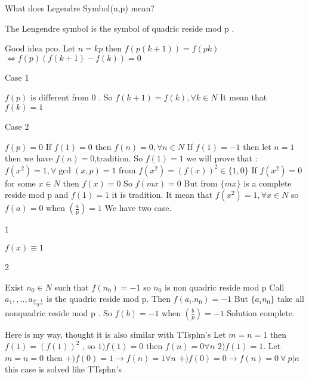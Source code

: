 \begin{mysolution}
	What does Legendre Symbol(n,p) mean?
\end{mysolution}



\begin{mysolution}
	The Lengendre symbol is the symbol of quadric reside mod p .
\end{mysolution}



\begin{mysolution}
	Good idea pco.
Let $ n = kp$ then 
$ f(p(k + 1)) = f(pk)$
$ \Longleftrightarrow f(p)(f(k + 1) - f(k)) = 0$ 
\begin{underlined}Case 1\end{underlined} $ f(p)$ is different from 0 . 
So $ f(k + 1) = f(k),\forall k\in N$ 
It mean that 
$ f(k) = 1$
\begin{underlined}Case 2\end{underlined} $ f(p) = 0$
If $ f(1) = 0$ then $ f(n) = 0,\forall n\in N$
If $ f(1) = - 1$ then let $ n = 1$ then we have $ f(n) = 0$,tradition.
So $ f(1) = 1$
we will prove that : $ f(x^2) = 1,\forall \gcd(x,p) = 1$
from  $ f(x^2) = (f(x))^2\in \{ 1,0\}$ 
If $ f(x^2) = 0$ for some $ x\in N$ then 
$ f(x) = 0$ 
So $ f(mx) = 0$ 
But from $ \{mx\}$ is a complete reside mod p and $ f(1) = 1$ it is tradition.
It mean that $ f(x^2) = 1,\forall x\in N$ so $ f(a) = 0$ when $ (\frac {a}{p}) = 1$
We have two case. 
\begin{bolded}1\end{bolded} $ f(x)\equiv 1$
\begin{bolded}2\end{bolded} Exist $ n_0\in N$ such that $ f(n_0) = - 1$  so $ n_0$ is non quadric reside mod p
Call 
$ a_{1},,.., a_{\frac {p - 1}{2}}$
is the quadric  reside mod p. 
Then $ f(a_i.n_0) = - 1$ 
But $ \{a_i n_0\}$ take all nonquadric reside mod p . 
So $ f(b) = - 1$ when $ (\frac {b}{p}) = - 1$ 
Solution complete.
\end{mysolution}



\begin{mysolution}
	Here is my way, thought it is also similar with TTsphn's
Let $ m=n=1$ then $ f(1)=(f(1))^{2}$ , so
$ 1) f(1)=0$ then $ f(n)=0 \forall n$
$ 2) f(1)=1.$ Let $ m=n=0$ then
$ +)f(0)=1 \to f(n)=1 \forall n$
$ +)f(0)=0 \to f(n)=0 \ \forall \ p|n$
this case is solved like TTsphn's
\end{mysolution}



